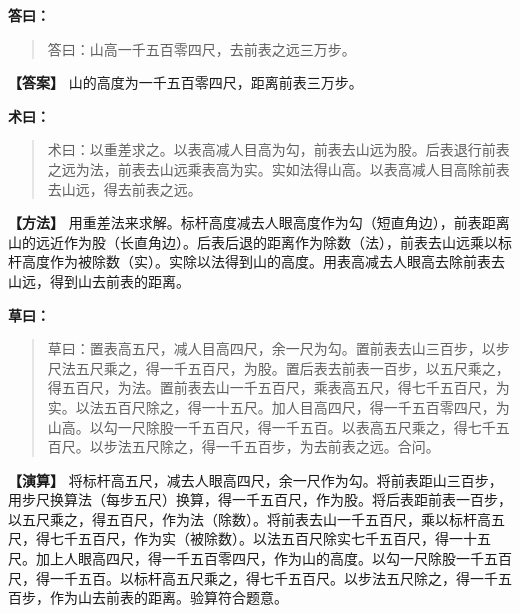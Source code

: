 \documentclass[11pt,a4paper]{article}
\newcommand{\dalabel}{\textbf{\color{origcolor}答曰：}}
\newcommand{\shulabel}{\textbf{\color{origcolor}术曰：}}
\newcommand{\caolabel}{\textbf{\color{origcolor}草曰：}}
\newcommand{\moddalabel}{\textbf{\color{modcolor}【答案】}}
\newcommand{\modshulabel}{\textbf{\color{modcolor}【方法】}}
\newcommand{\modcaolabel}{\textbf{\color{modcolor}【演算】}}
\begin{document}
\begin{originaltext}
\dalabel
\begin{quote}
\textcolor{origcolor}{%
答曰：山高一千五百零四尺，去前表之远三万步。
}
\end{quote}
\end{originaltext}

\begin{moderntext}
\moddalabel
山的高度为一千五百零四尺，距离前表三万步。
\end{moderntext}

\begin{originaltext}
\shulabel
\begin{quote}
\textcolor{origcolor}{%
术曰：以重差求之。以表高减人目高为勾，前表去山远为股。后表退行前表之远为法，前表去山远乘表高为实。实如法得山高。以表高减人目高除前表去山远，得去前表之远。
}
\end{quote}
\end{originaltext}

\begin{moderntext}
\modshulabel
用重差法来求解。标杆高度减去人眼高度作为勾（短直角边），前表距离山的远近作为股（长直角边）。后表后退的距离作为除数（法），前表去山远乘以标杆高度作为被除数（实）。实除以法得到山的高度。用表高减去人眼高去除前表去山远，得到山去前表的距离。
\end{moderntext}

\begin{originaltext}
\caolabel
\begin{quote}
\textcolor{origcolor}{%
草曰：置表高五尺，减人目高四尺，余一尺为勾。置前表去山三百步，以步尺法五尺乘之，得一千五百尺，为股。置后表去前表一百步，以五尺乘之，得五百尺，为法。置前表去山一千五百尺，乘表高五尺，得七千五百尺，为实。以法五百尺除之，得一十五尺。加人目高四尺，得一千五百零四尺，为山高。以勾一尺除股一千五百尺，得一千五百。以表高五尺乘之，得七千五百尺。以步法五尺除之，得一千五百步，为去前表之远。合问。
}
\end{quote}
\end{originaltext}

\begin{moderntext}
\modcaolabel
将标杆高五尺，减去人眼高四尺，余一尺作为勾。将前表距山三百步，用步尺换算法（每步五尺）换算，得一千五百尺，作为股。将后表距前表一百步，以五尺乘之，得五百尺，作为法（除数）。将前表去山一千五百尺，乘以标杆高五尺，得七千五百尺，作为实（被除数）。以法五百尺除实七千五百尺，得一十五尺。加上人眼高四尺，得一千五百零四尺，作为山的高度。以勾一尺除股一千五百尺，得一千五百。以标杆高五尺乘之，得七千五百尺。以步法五尺除之，得一千五百步，作为山去前表的距离。验算符合题意。
\end{moderntext}
\end{document}
